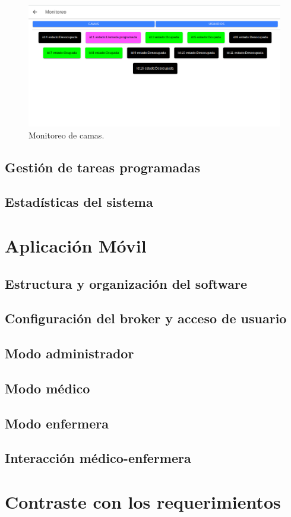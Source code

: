 \begin{figure}[ht]
	\centering
	\includegraphics[scale=.40]{./Figures/monitoreo-camas.png}
	\caption{Monitoreo de camas.}
	\label{fig:Monitoreo de camas}
\end{figure} 
 
\subsection{Gestión de tareas programadas}
\subsection{Estadísticas del sistema}
\section{Aplicación Móvil}
\subsection{Estructura y organización del software}
\subsection{Configuración del broker y acceso de usuario}
\subsection{Modo administrador}
\subsection{Modo médico}
\subsection{Modo enfermera}
\subsection{Interacción médico-enfermera}
\section{Contraste con los requerimientos}

